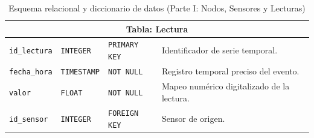 \begin{table}[H]
{\begin{tabular}{|l|l|l|l|}
        \multicolumn{4}{|c|}{\textbf{Tabla: Lectura}} \\ \hline
        \texttt{id\_lectura} & \texttt{INTEGER} & \texttt{PRIMARY KEY} & \parbox[c]{5.6cm}{\vspace{0.15cm}Identificador de serie temporal.\vspace{0.15cm}} \\ \hline
        \texttt{fecha\_hora} & \texttt{TIMESTAMP} & \texttt{NOT NULL} & \parbox[c]{5.6cm}{\vspace{0.15cm}Registro temporal preciso del evento.\vspace{0.15cm}} \\ \hline
        \texttt{valor} & \texttt{FLOAT} & \texttt{NOT NULL} & \parbox[c]{5.6cm}{\vspace{0.15cm}Mapeo numérico digitalizado de la lectura.\vspace{0.15cm}} \\ \hline
        \texttt{id\_sensor} & \texttt{INTEGER} & \texttt{FOREIGN KEY} & \parbox[c]{5.6cm}{\vspace{0.15cm}Sensor de origen.\vspace{0.15cm}} \\ \hline
    \end{tabular}
    }
    \caption{Esquema relacional y diccionario de datos (Parte I: Nodos, Sensores y Lecturas)}
    \label{tab:esquema_relacional_1}

\end{table}

